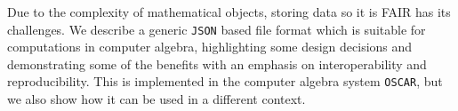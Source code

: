 \documentclass[english]{article}
\begin{document}
Due to the complexity of mathematical objects, storing data so it is FAIR has its challenges.
We describe a generic \texttt{JSON} based file format which is suitable for computations in computer algebra,
highlighting some design decisions and demonstrating some of the benefits with an emphasis on interoperability and reproducibility.
This is implemented in the computer algebra system \texttt{OSCAR}, but we also show how it can be used in a different context.

  
\end{document}
